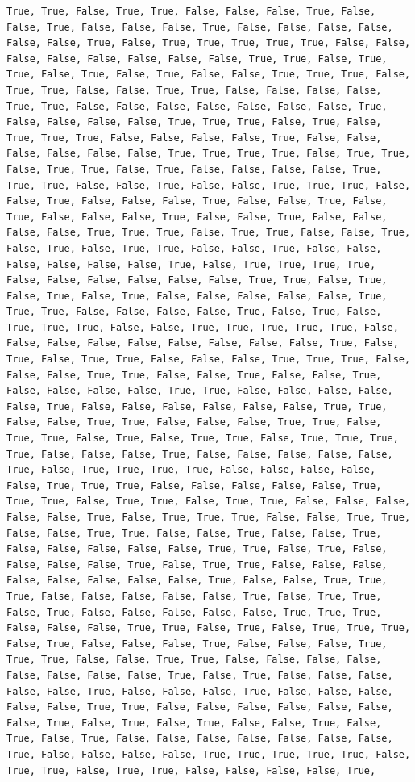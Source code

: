 \documentclass[
  letterpaper,
  DIV=11,
  numbers=noendperiod]{scrartcl}
\begin{document}
\begin{verbatim}
True, True, False, True, True, False, False, False, True, False, False, True, False, False, False, True, False, False, False, False, False, False, True, False, True, True, True, True, True, False, False, False, False, False, False, False, False, True, True, False, True, True, False, True, False, True, False, False, True, True, True, False, True, True, False, False, True, True, False, False, False, False, True, True, False, False, False, False, False, False, False, True, False, False, False, False, True, True, True, False, True, False, True, True, True, False, False, False, False, True, False, False, False, False, False, False, True, True, True, True, False, True, True, False, True, True, False, True, False, False, False, False, True, True, True, False, False, True, False, False, True, True, True, False, False, True, False, False, False, True, False, False, True, False, True, False, False, False, True, False, False, True, False, False, False, False, True, True, True, False, True, True, False, False, True, False, True, False, True, True, False, False, True, False, False, False, False, False, False, True, False, True, True, True, True, False, False, False, False, False, False, True, True, False, True, False, True, False, True, False, False, False, False, False, True, True, True, False, False, False, False, True, False, True, False, True, True, True, False, False, True, True, True, True, True, False, False, False, False, False, False, False, False, False, True, False, True, False, True, True, False, False, False, True, True, True, False, False, False, True, True, False, False, True, False, False, True, False, False, False, False, True, True, False, False, False, False, False, True, False, False, False, False, False, False, True, True, False, False, True, True, False, False, False, True, True, False, True, True, False, True, False, True, True, False, True, True, True, True, False, False, False, True, False, False, False, False, False, True, False, True, True, True, True, False, False, False, False, False, True, True, True, False, False, False, False, False, True, True, True, False, True, True, False, True, True, False, False, False, False, False, True, False, True, True, True, False, False, True, True, False, False, True, True, False, False, True, False, False, True, False, False, False, False, False, True, True, False, True, False, False, False, False, True, False, True, True, False, False, False, False, False, False, False, False, True, False, False, True, True, True, False, False, False, False, False, True, False, True, True, False, True, False, False, False, False, False, True, True, True, False, False, False, True, True, False, True, False, True, True, True, False, True, False, False, False, True, False, False, False, True, True, True, False, False, True, True, False, False, False, False, False, False, False, False, True, False, True, False, False, False, False, False, True, False, False, False, True, False, False, False, False, False, True, True, False, False, False, False, False, False, False, True, False, True, False, True, False, False, True, False, True, False, True, False, False, False, False, False, False, False, True, False, False, False, False, True, True, True, True, True, False, True, True, False, True, True, False, False, False, False, True, 
\end{verbatim}
\end{document}
